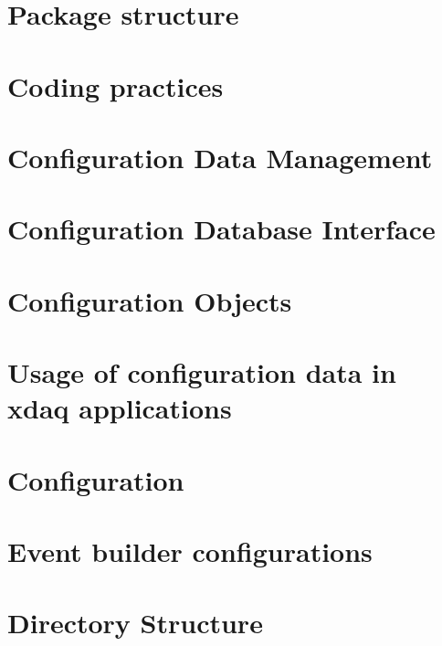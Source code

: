 \documentclass[12pt]{article}
\begin{document}
\section{Package structure}
\label{sect:swcomponets}


\section{Coding practices}
\label{sec:CodingPractices}


\section{Configuration Data Management}
\label{sec:ConfigurationDataManagement}


\section{Configuration Database Interface}
\label{sec:ConfigurationDatabaseInterface}


\section{Configuration Objects}
\label{sect:configobjects}


\section{Usage of configuration data in xdaq applications}
\label{sec:ConfigurationDataUsage}


\section{Configuration}
\label{sec:configuration}


\section{Event builder configurations}
\label{sec:EventBuilderConfigurations}


\section{Directory Structure}
\label{directorystructure}

\end{document}
